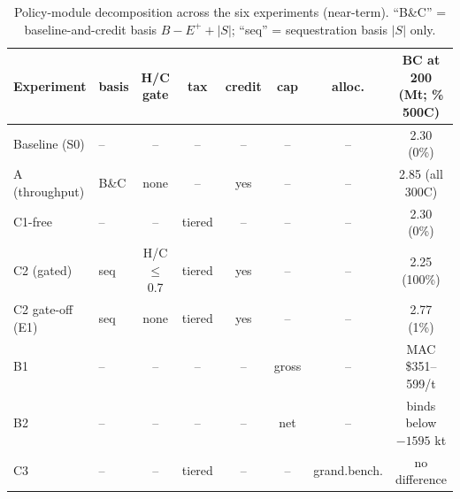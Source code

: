 \begin{table}[htbp]
\centering
\footnotesize
\setlength{\tabcolsep}{3pt}
\caption{Policy-module decomposition across the six experiments (near-term).
``B\&C'' = baseline-and-credit basis $B-E^{+}+|S|$; ``seq'' = sequestration
basis $|S|$ only.}
\label{tab:s8}
\begin{tabular}{llcccccc}
\toprule
Experiment & basis & H/C gate & tax & credit & cap & alloc. & BC at 200 (Mt; \% 500C)\\
\midrule
Baseline (S0) & -- & -- & -- & -- & -- & -- & 2.30 (0\%)\\
A (throughput) & B\&C & none & -- & yes & -- & -- & 2.85 (all 300C)\\
C1-free & -- & -- & tiered & -- & -- & -- & 2.30 (0\%)\\
C2 (gated) & seq & H/C$\le$0.7 & tiered & yes & -- & -- & 2.25 (100\%)\\
C2 gate-off (E1) & seq & none & tiered & yes & -- & -- & 2.77 (1\%)\\
B1 & -- & -- & -- & -- & gross & -- & MAC \$351--599/t\\
B2 & -- & -- & -- & -- & net & -- & binds below $-1595$ kt\\
C3 & -- & -- & tiered & -- & -- & grand.\/bench. & no difference\\
\bottomrule
\end{tabular}
\end{table}

\begin{table}[htbp]
\centering
\footnotesize
\setlength{\tabcolsep}{4pt}
\caption{Solver certificates for every point whose original gap exceeded 2\%
(review R1-M7). The best bound is derived from the incumbent and Gurobi's
relative MIP gap ($\mathrm{bound}=\mathrm{incumbent}\times(1+\mathrm{gap})$ for
a maximization), so it is a derived rather than a directly reported quantity;
the certificate CSVs record the incumbent, gap, and termination status per run.
The time limit enforced for each re-solve is given in place of wall-clock
runtime, which the sweep scripts do not record; Step-1 runtimes are archived in
the \texttt{S0\_summary.txt} files. No certified point exceeds a 2.8\% gap.}
\label{tab:s9}

\end{table}
